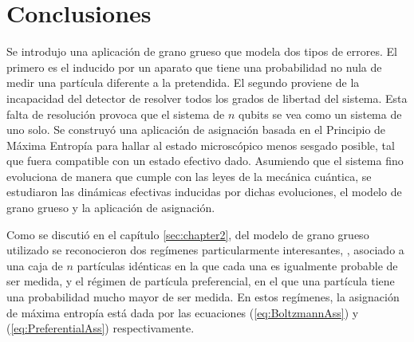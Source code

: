 \chapter{Conclusiones}




Se introdujo una aplicación de grano grueso que modela dos tipos de errores. El primero es el inducido por un aparato que tiene una probabilidad no nula de medir una partícula diferente a la pretendida. El segundo proviene de la incapacidad del detector de resolver todos los grados de libertad del sistema. Esta falta de resolución provoca que el sistema de $n$ qubits se vea como un sistema de uno solo. Se construyó una aplicación de asignación basada en el Principio de Máxima Entropía para hallar al estado microscópico menos sesgado posible, tal que fuera compatible con un estado efectivo dado. Asumiendo que el sistema fino evoluciona de manera que cumple con las leyes de la mecánica cuántica, se estudiaron las dinámicas efectivas inducidas por dichas evoluciones, el modelo de grano grueso y la aplicación de asignación.


Como se discutió en el capítulo \ref{sec:chapter2}, del modelo de grano grueso utilizado se reconocieron dos regímenes particularmente interesantes,  , asociado a una caja de $n$ partículas idénticas en la que cada una es igualmente probable de ser medida, y el régimen de partícula preferencial, en el que una partícula tiene una probabilidad mucho mayor de ser medida. En estos regímenes, la asignación de máxima entropía está dada por las ecuaciones (\ref{eq:BoltzmannAss}) y (\ref{eq:PreferentialAss}) respectivamente.

